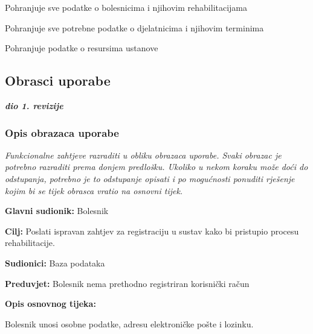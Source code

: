 \begin{packed_enum}
\begin{packed_enum}
	\end{packed_enum}

	\item {}

	\begin{packed_enum}

		\item Pohranjuje sve podatke o bolesnicima i njihovim rehabilitacijama
		\item Pohranjuje sve potrebne podatke o djelatnicima i njihovim terminima
       		\item Pohranjuje podatke o resursima ustanove 

	\end{packed_enum}
\end{packed_enum}

\eject



\subsection{Obrasci uporabe}

\textbf{\textit{dio 1. revizije}}

\subsubsection{Opis obrazaca uporabe}
\textit{Funkcionalne zahtjeve razraditi u obliku obrazaca uporabe. Svaki obrazac je potrebno razraditi prema donjem predlošku. Ukoliko u nekom koraku može doći do odstupanja, potrebno je to odstupanje opisati i po mogućnosti ponuditi rješenje kojim bi se tijek obrasca vratio na osnovni tijek.}
\vspace{2em} %

	\item \textbf{Glavni sudionik:} Bolesnik
	\item \textbf{Cilj:} Poslati ispravan zahtjev za registraciju u sustav kako bi pristupio procesu rehabilitacije.
	\item \textbf{Sudionici:} Baza podataka
	\item \textbf{Preduvjet:} Bolesnik nema prethodno registriran korisnički račun
	\item \textbf{Opis osnovnog tijeka:}
	\begin{packed_enum}
		\item Bolesnik unosi osobne podatke, adresu elektroničke pošte i lozinku.
	\end{packed_enum}
\closeusecase


